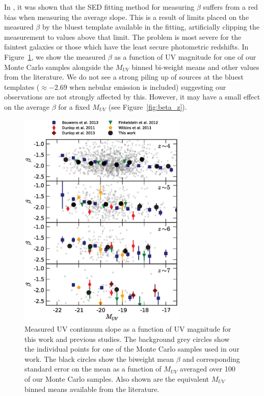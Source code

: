 In \citet{2013MNRAS.429.2456R}, it was shown that the SED fitting method for measuring $\beta$ suffers from a red bias when measuring the average slope. This is a result of limits placed on the measured $\beta$ by the bluest template available in the fitting, artificially clipping the measurement to values above that limit. The problem is most severe for the faintest galaxies or those which have the least secure photometric redshifts. In Figure~\ref{fig:beta_muv}, we show the measured $\beta$ as a function of UV magnitude for one of our Monte Carlo samples alongside the $M_{UV}$ binned bi-weight means and other values from the literature. We do not see a strong piling up of sources at the bluest templates ($\approx -2.69$ when nebular emission is included) suggesting our observations are not strongly affected by this. However, it may have a small effect on the average $\beta$ for a fixed $M_{UV}$ (see Figure~\ref{fig:beta_z}).

\begin{figure}
\centering
\includegraphics[width=80mm]{plots/figB2.eps}
\caption{Measured UV continuum slope as a function of UV magnitude for this work and previous studies. The background grey circles show the individual points for one of the Monte Carlo samples used in our work. The black circles show the biweight mean $\beta$ and corresponding standard error on the mean as a function of $M_{UV}$ averaged over 100 of our Monte Carlo samples. Also shown are the equivalent $M_{UV}$ binned means available from the literature.}
\label{fig:beta_muv}
\end{figure}

